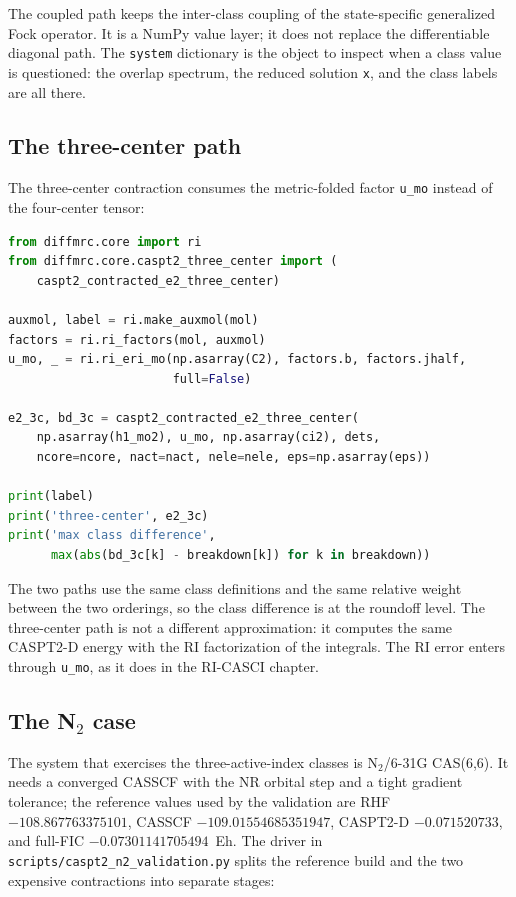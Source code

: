 The coupled path keeps the inter-class coupling of the state-specific
generalized Fock operator.  It is a NumPy value layer; it does not
replace the differentiable diagonal path.  The \texttt{system}
dictionary is the object to inspect when a class value is questioned:
the overlap spectrum, the reduced solution \texttt{x}, and the class
labels are all there.

\subsection{The three-center path}

The three-center contraction consumes the metric-folded factor
\texttt{u\_mo} instead of the four-center tensor:

\begin{lstlisting}[language=Python]
from diffmrc.core import ri
from diffmrc.core.caspt2_three_center import (
    caspt2_contracted_e2_three_center)

auxmol, label = ri.make_auxmol(mol)
factors = ri.ri_factors(mol, auxmol)
u_mo, _ = ri.ri_eri_mo(np.asarray(C2), factors.b, factors.jhalf,
                       full=False)

e2_3c, bd_3c = caspt2_contracted_e2_three_center(
    np.asarray(h1_mo2), u_mo, np.asarray(ci2), dets,
    ncore=ncore, nact=nact, nele=nele, eps=np.asarray(eps))

print(label)
print('three-center', e2_3c)
print('max class difference',
      max(abs(bd_3c[k] - breakdown[k]) for k in breakdown))
\end{lstlisting}

The two paths use the same class definitions and the same relative
weight between the two orderings, so the class difference is at the
roundoff level.  The three-center path is not a different
approximation: it computes the same CASPT2-D energy with the RI
factorization of the integrals.  The RI error enters through
\texttt{u\_mo}, as it does in the RI-CASCI chapter.

\subsection{The N\texorpdfstring{$_2$}{2} case}

The system that exercises the three-active-index classes is
N$_2$/6-31G CAS(6,6).  It needs a converged CASSCF with the NR orbital
step and a tight gradient tolerance; the reference values used by the
validation are RHF $-108.867763375101$, CASSCF
$-109.01554685351947$, CASPT2-D $-0.071520733$, and full-FIC
$-0.07301141705494$~Eh.  The driver in
\texttt{scripts/caspt2\_n2\_validation.py} splits the reference build
and the two expensive contractions into separate stages:


